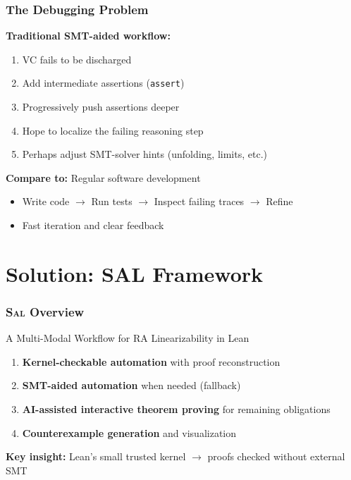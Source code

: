 \documentclass[usepdftitle=false]{beamer}
\newcommand{\sal}{\textsc{Sal}\xspace}
\begin{document}
\begin{frame}
  \frametitle{The Debugging Problem}
  
  \textbf{Traditional SMT-aided workflow:}
  \begin{enumerate}
    \item VC fails to be discharged
    \item Add intermediate assertions (\texttt{assert})
    \item Progressively push assertions deeper
    \item Hope to localize the failing reasoning step
    \item Perhaps adjust SMT-solver hints (unfolding, limits, etc.)
  \end{enumerate}
  
  \vspace{0.3cm}
  \textbf{Compare to:} Regular software development
  \begin{itemize}
    \item Write code $\rightarrow$ Run tests $\rightarrow$ Inspect failing traces $\rightarrow$ Refine
    \item Fast iteration and clear feedback
  \end{itemize}
\end{frame}

\section{Solution: SAL Framework}

\begin{frame}
  \frametitle{\sal Overview}
  
  \begin{block}{A Multi-Modal Workflow for RA Linearizability in Lean}
    \begin{enumerate}
      \item \textbf{Kernel-checkable automation} with proof reconstruction
      \item \textbf{SMT-aided automation} when needed (fallback)
      \item \textbf{AI-assisted interactive theorem proving} for remaining obligations
      \item \textbf{Counterexample generation} and visualization
    \end{enumerate}
  \end{block}
  
  \vspace{0.3cm}
  \textbf{Key insight:} Lean's small trusted kernel $\rightarrow$ proofs checked without external SMT
\end{frame}
\end{document}

